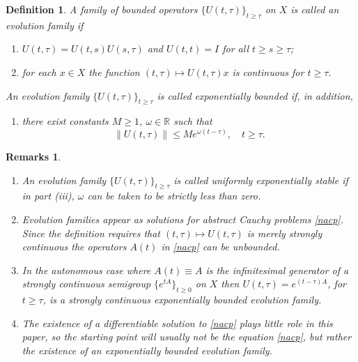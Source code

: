 \documentclass[10pt,psamsfonts,leqno]{siamltex}
\newtheorem{defn}[prop]{Definition}
\newtheorem{rmks}[prop]{Remarks}
\newcommand{\bbR}{\mathbb{R}}
\newcommand{\lb}{\label}
\begin{document}
\begin{defn}\lb{DEFevolfam}  A family of bounded operators
$\{U(t,\tau)\}_{t \geq \tau}$ on $X$
is called an {\em evolution family} if
\begin{enumerate}
\item
$U(t,\tau )=U(t,s)U(s,\tau )$ and $U(t,t)=I$ for all
$t \geq s\geq \tau$;
\item for each $x\in X$ the function $(t ,\tau)\mapsto
U(t,\tau)x$ is continuous for $t \geq \tau$.
\end{enumerate}
An evolution family $\{U(t ,\tau)\}_{t \geq \tau}$ is
called {\em exponentially bounded} if, in addition,
\begin{enumerate}
\item[(iii)]
there exist constants $M\geq 1$, $\omega\in\bbR$ such that
$$
\|U(t, \tau)\|\leq Me^{\omega (t -\tau)},\quad  t \geq \tau.
$$
\end{enumerate}
\end{defn}

\begin{rmks}
\begin{enumerate}
\item[(a)] An evolution family $\{U(t,\tau)\}_{t\ge\tau}$
is called {\em uniformly
exponentially stable}  if in part (iii), $\omega$ can be taken to be
strictly less than zero.
\item[(b)] Evolution families appear as solutions for abstract Cauchy
problems \eqref{nacp}.  Since the definition requires
 that $(t ,\tau)\mapsto U(t,\tau)$ is merely strongly continuous
the operators $A(t)$ in \eqref{nacp} can be unbounded.
\item[(c)] In the autonomous case where $A(t)\equiv A$ is the
infinitesimal generator of a strongly continuous semigroup
$\{e^{tA}\}_{t\ge 0}$ on $X$ then $U(t, \tau)=e^{(t-\tau )A}$, for
$t \geq \tau$, is a strongly continuous exponentially bounded
evolution family.
\item[(d)]  The existence of a {\em differentiable} solution to
\eqref{nacp} plays little role in this paper, so the starting point
will usually not be the equation \eqref{nacp}, but rather the
existence of an exponentially bounded evolution family.
\end{enumerate}
\end{rmks}
\end{document}
